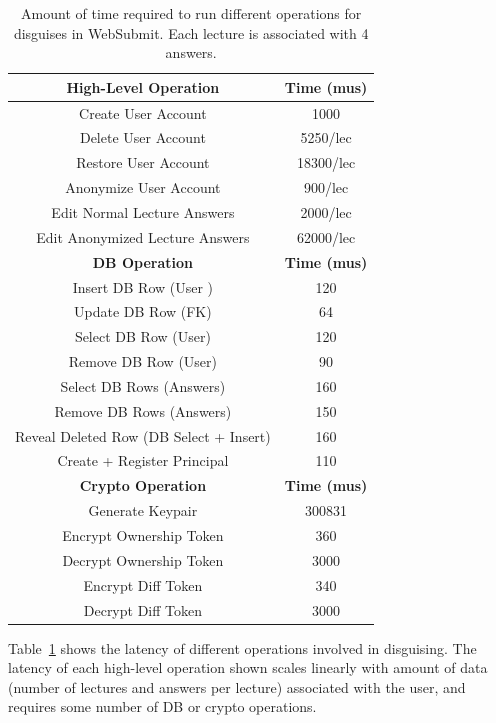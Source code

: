 \begin{table}[t!]
\begin{center}
\begin{tabular}{ c c }
 \textbf{High-Level Operation} & \textbf{Time (mus)}\\
\hline
    Create User Account & 1000\\
    Delete User Account & 5250/lec\\
    Restore User Account & 18300/lec\\
    Anonymize User Account & 900/lec\\
    Edit Normal Lecture Answers & 2000/lec \\
    Edit Anonymized Lecture Answers & 62000/lec \\
\hline
    \textbf{DB Operation} & \textbf{Time (mus)}\\
\hline
Insert DB Row (User )& 120\\
Update DB Row (FK) & 64\\ 
Select DB Row (User) & 120\\
Remove DB Row (User) & 90\\
Select DB Rows (Answers) & 160\\
Remove DB Rows (Answers) & 150\\
Reveal Deleted Row (DB Select + Insert) & 160 \\
Create + Register Principal & 110\\
\hline
    \textbf{Crypto Operation} & \textbf{Time (mus)}\\
\hline
Generate Keypair & 300831\\
Encrypt Ownership Token & 360\\
Decrypt Ownership Token & 3000\\
Encrypt Diff Token & 340\\
Decrypt Diff Token & 3000\\
\end{tabular}
\end{center}
\caption{Amount of time required to run different operations for disguises in WebSubmit. Each
    lecture is associated with 4 answers.}
    \label{tab:opstats}
\end{table}

Table~\ref{tab:opstats} shows the latency of different operations involved in disguising. 
The latency of each high-level operation shown scales linearly with amount
of data (\ie number of lectures and answers per lecture) associated with the user,
and requires some number of DB or crypto operations.

